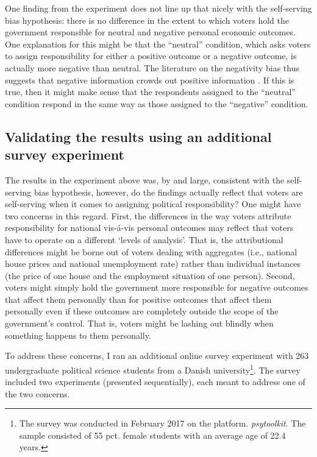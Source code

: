 \documentclass[a4paper,11pt]{article}
\begin{document}
	One finding from the experiment does not line up that nicely with the self-serving bias hypothesis: there is no difference in the extent to which voters hold the government responsible for neutral and negative personal economic outcomes. One explanation for this might be that the ``neutral'' condition, which asks voters to assign responsibility for either a positive outcome or a negative outcome, is actually more negative than neutral. The literature on the negativity bias thus suggests that negative information crowds out positive information \citep{rozin2001negativity,olsen2015citizen}. If this is true,  then it might make sense that the respondents assigned to the ``neutral'' condition respond in the same way as those assigned to the ``negative'' condition.
	
	
	
	
	\subsection*{Validating the results using an additional survey experiment}
	
	The results in the experiment above was, by and large, consistent with the self-serving bias hypothesis, however, do the findings actually reflect that voters are self-serving when it comes to assigning political responsibility? One might have two concerns in this regard. First, the differences in the way voters attribute responsibility for national vis-á-vis personal outcomes may reflect that voters have to operate on a different `levels of analysis'. That is, the attributional differences might be borne out of voters dealing with aggregates (i.e., national house prices and national unemployment rate) rather than individual instances (the price of one house and the employment situation of one person). Second, voters might simply hold the government more responsible for negative outcomes that affect them personally than for positive outcomes that affect them personally even if these outcomes are completely outside the scope of the  government's  control. That is, voters might be lashing out blindly when something happens to them personally.
	
	To address these concerns, I ran an additional online survey experiment with 263 undergraduate political science students from a Danish university\footnote{The survey was conducted in February 2017 on the platform. \emph{psytoolkit}. The sample consisted of 55 pct. female students with an average age of 22.4 years.}. The survey included two experiments (presented sequentially), each meant to address one of the two concerns. 
	
\end{document}

